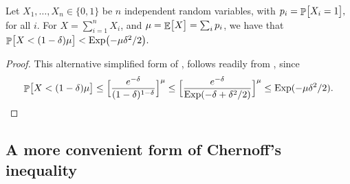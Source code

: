 \begin{fragment}{}
\begin{lemma}
    Let $X_1, \ldots, X_n \in \{0,1\}$ be $n$ independent random
    variables, with
    \begin{math}
        p_i = \Prob{ \bigl. X_i = 1 },        
    \end{math}
    for all $i$.  For $X = \sum_{i=1}^{n} X_i$, and
    $\mu = \mathop{\mathbb{E}}\!\left[ {\bigl. X} \right] = \sum_i p_i$, we have that
    \begin{math}
        \Prob{\bigl. X < (1-\delta)\mu } < \Exp\pth{-\mu\delta^2/2}.
    \end{math}
\end{lemma}
\end{fragment}
\begin{proof}
    This alternative simplified form of , follows
    readily from , since
    \begin{equation*}
        \Prob{ X < (1-\delta)\mu \bigr.} %
        \leq%
        \Bigl[  \frac{e^{-\delta}}{(1-\delta)^{1-\delta}} \Bigr]^\mu%
        \leq 
        \Bigl[  \frac{e^{-\delta}}{\Exp\pth{ -\delta + \delta^2/2} }
        \Bigr]^\mu%
        \leq
        \Exp( -\mu\delta^2/2).
    \end{equation*}
\end{proof}

\subsection{A more convenient form of Chernoff's %
   inequality}


